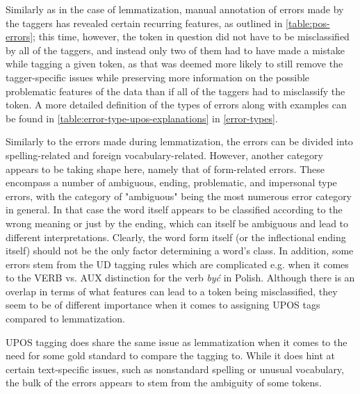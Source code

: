 Similarly as in the case of lemmatization, manual annotation of errors made by the taggers has revealed certain recurring features, as outlined in \autoref{table:pos-errors}; this time, however, the token in question did not have to be misclassified by all of the taggers, and instead only two of them had to have made a mistake while tagging a given token, as that was deemed more likely to still remove the tagger-specific issues while preserving more information on the possible problematic features of the data than if all of the taggers had to misclassify the token. A more detailed definition of the types of errors along with examples can be found in \autoref{table:error-type-upos-explanations} in \autoref{error-types}.

Similarly to the errors made during lemmatization, the errors can be divided into spelling-related and foreign vocabulary-related. However, another category appears to be taking shape here, namely that of form-related errors. These encompass a number of ambiguous, ending, problematic, and impersonal type errors, with the category of "ambiguous" being the most numerous error category in general. In that case the word itself appears to be classified according to the wrong meaning or just by the ending, which can itself be ambiguous and lead to different interpretations. Clearly, the word form itself (or the inflectional ending itself) should not be the only factor determining a word's class. In addition, some errors stem from the UD tagging rules which are complicated e.g. when it comes to the VERB vs. AUX distinction for the verb \textit{być} in Polish. Although there is an overlap in terms of what features can lead to a token being misclassified, they seem to be of different importance when it comes to assigning UPOS tags compared to lemmatization.

UPOS tagging does share the same issue as lemmatization when it comes to the need for some gold standard to compare the tagging to. While it does hint at certain text-specific issues, such as nonstandard spelling or unusual vocabulary, the bulk of the errors appears to stem from the ambiguity of some tokens.

